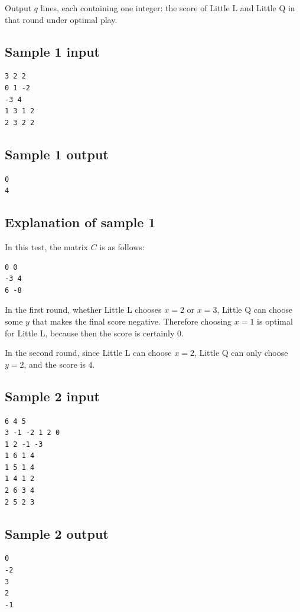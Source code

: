 \documentclass[11pt]{article}
\begin{document}
Output $q$ lines, each containing one integer:
the score of Little L and Little Q in that round under optimal play.

\subsection*{Sample 1 input}

\begin{verbatim}
3 2 2
0 1 -2
-3 4
1 3 1 2
2 3 2 2
\end{verbatim}

\subsection*{Sample 1 output}

\begin{verbatim}
0
4
\end{verbatim}

\subsection*{Explanation of sample 1}

In this test, the matrix $C$ is as follows:

\begin{verbatim}
0 0
-3 4
6 -8
\end{verbatim}

In the first round, whether Little L chooses $x = 2$ or $x = 3$,
Little Q can choose some $y$ that makes the final score negative.
Therefore choosing $x = 1$ is optimal for Little L,
because then the score is certainly $0$.

In the second round, since Little L can choose $x = 2$,
Little Q can only choose $y = 2$, and the score is $4$.

\subsection*{Sample 2 input}

\begin{verbatim}
6 4 5
3 -1 -2 1 2 0
1 2 -1 -3
1 6 1 4
1 5 1 4
1 4 1 2
2 6 3 4
2 5 2 3
\end{verbatim}

\subsection*{Sample 2 output}

\begin{verbatim}
0
-2
3
2
-1
\end{verbatim}
\end{document}
